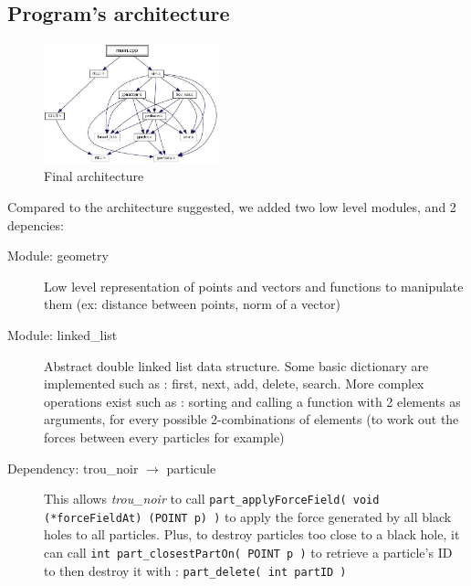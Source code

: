 \documentclass[a4paper]{article} %
\begin{document}
\begin{multicols*}{2}
\section{Program's architecture}


\begin{figure}[H]
\centering
\includegraphics[width=0.45\textwidth]{architecture.jpg}
\caption{Final architecture}
\end{figure}


Compared to the architecture suggested, we added two low level modules, and 2 depencies:
\begin{description}
\item[Module: geometry]
Low level representation of points and vectors and functions to manipulate them (ex: distance between points, norm of a vector)


\item[Module: linked\_list]
Abstract double linked list data structure.
Some basic dictionary are implemented such as : first, next, add, delete, search.
More complex operations exist such as : sorting and calling a function with 2 elements as arguments, for every possible 2-combinations of elements
(to work out the forces between every particles for example)


\item[Dependency: trou\_noir $\rightarrow$ particule]
This allows \emph{trou\_noir} to call \texttt{part\_applyForceField( void (*forceFieldAt) (POINT p) )}
to apply the force generated by all black holes to all particles.
Plus, to destroy particles too close to a black hole, it can call \texttt{int part\_closestPartOn( POINT p )}
to retrieve a particle's ID to then destroy it with : \texttt{part\_delete( int partID )}


\end{description}
\end{multicols*}
\end{document}
